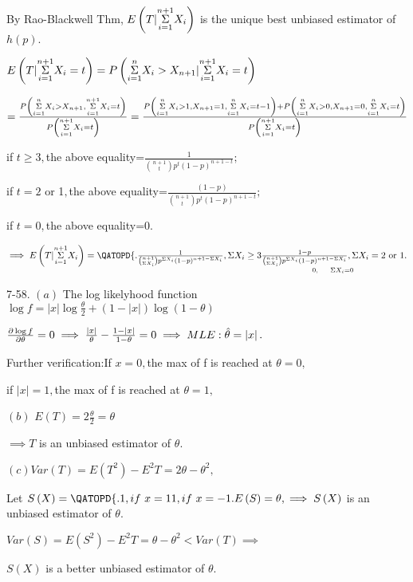 \documentclass{article}
\begin{document}
\bigskip By Rao-Blackwell Thm, $E\left( T|\underset{i=1}{\overset{n+1}{%
\Sigma }}X_{i}\right) $ is the unique best unbiased estimator of $h\left(
p\right) .$

\bigskip $E\left( T|\underset{i=1}{\overset{n+1}{\Sigma }}X_{i}=t\right)
=P\left( \underset{i=1}{\overset{n}{\Sigma }}X_{i}>X_{n+1}|\underset{i=1}{%
\overset{n+1}{\Sigma }}X_{i}=t\right) $

$=\frac{P\left( \underset{i=1}{\overset{n}{\Sigma }}X_{i}>X_{n+1},\underset{%
i=1}{\overset{n+1}{\Sigma }}X_{i}=t\right) }{P\left( \underset{i=1}{\overset{%
n+1}{\Sigma }}X_{i}=t\right) }=\frac{P\left( \underset{i=1}{\overset{n}{%
\Sigma }}X_{i}>1,X_{n+1}=1,\underset{i=1}{\overset{n}{\Sigma }}%
X_{i}=t-1\right) +P\left( \underset{i=1}{\overset{n}{\Sigma }}%
X_{i}>0,X_{n+1}=0,\underset{i=1}{\overset{n}{\Sigma }}X_{i}=t\right) }{%
P\left( \underset{i=1}{\overset{n+1}{\Sigma }}X_{i}=t\right) }$

if $t\geq 3,$the above equality=$\frac{1}{\binom{n+1}{t}p^{t}\left(
1-p\right) ^{n+1-t}};$

if $t=2$ or 1$,$the above equality=$\frac{\left( 1-p\right) }{\binom{n+1}{t}%
p^{t}\left( 1-p\right) ^{n+1-t}};$

if $t=0,$the above equality=0.

$\implies E\left( T|\underset{i=1}{\overset{n+1}{\Sigma }}X_{i}\right)
=\QATOPD\{ . {\frac{1}{\binom{n+1}{\Sigma X_{i}}p^{\Sigma X_{i}}\left(
1-p\right) ^{n+1-\Sigma X_{i}}},\Sigma X_{i}\geq 3}{\underset{0,\text{ \ \ \
\ }\Sigma X_{i}=0}{\frac{1-p}{\binom{n+1}{\Sigma X_{i}}p^{\Sigma
X_{i}}\left( 1-p\right) ^{n+1-\Sigma X_{i}}},\Sigma X_{i}=2\text{ or 1}}}.$

7-58. $\left( a\right) $ The log likelyhood function $\log f=\left\vert
x\right\vert \log \frac{\theta }{2}+\left( 1-\left\vert x\right\vert \right)
\log \left( 1-\theta \right) $

$\bigskip \frac{\partial \log f}{\partial \theta }=0\implies \frac{%
\left\vert x\right\vert }{\theta }-\frac{1-\left\vert x\right\vert }{%
1-\theta }=0\implies MLE:\hat{\theta}=\left\vert x\right\vert .$

Further verification:If $x=0,$the max of f is reached at $\theta =0,$

if $\left\vert x\right\vert =1,$the max of f is reached at $\theta =1,$

$\left( b\right) $ $E\left( T\right) =2\frac{\theta }{2}=\theta $

$\implies T$ is an unbiased estimator of $\theta .$

$\left( c\right) Var\left( T\right) =E\left( T^{2}\right) -E^{2}T=2\theta
-\theta ^{2},$

Let $S\left( X\right) =\QATOPD\{ . {1,if\text{ }x=1}{1,if\text{ }%
x=-1}.E\left( S\right) =\theta ,\implies S\left( X\right) $ is an unbiased
estimator of $\theta .$

$Var\left( S\right) =E\left( S^{2}\right) -E^{2}T=\theta -\theta
^{2}<Var\left( T\right) \implies $

$S\left( X\right) $ is a better unbiased estimator of $\theta .$
\end{document}
